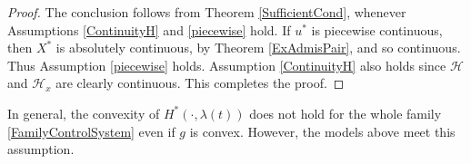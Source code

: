 \begin{proof} The conclusion follows from Theorem \ref{SufficientCond}, whenever Assumptions \ref{ContinuityH} and \ref{piecewise} hold. 
If $u^\ast$ is piecewise continuous, then $X^\ast$ is absolutely continuous, by Theorem \ref{ExAdmisPair}, and so continuous. Thus Assumption \ref{piecewise} holds. Assumption \ref{ContinuityH} also holds since $\mathcal{H}$ and $\mathcal{H}_x$ are clearly continuous. This completes the proof.
\end{proof}

\begin{remark} In general, the convexity of $H^\ast(\cdot,\lambda(t))$ does not hold for the whole family \eqref{FamilyControlSystem} even if $g$ is convex. However, the models above meet this assumption.  
\end{remark}